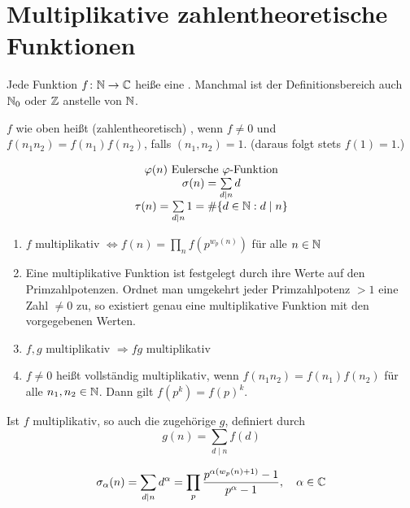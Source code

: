 \section{Multiplikative zahlentheoretische Funktionen}
\label{sec:para8}
	Jede Funktion $f \colon \mathbb{N} \rightarrow \mathbb{C}$ heiße eine . Manchmal ist der Definitionsbereich auch $\mathbb{N}_0$ oder $\mathbb{Z}$ anstelle von $\mathbb{N}$.

\begin{defn}	\label{def_8.1}
	$f$ wie oben heißt (zahlentheoretisch) , wenn $f \neq 0$ und $f(n_1n_2) = f(n_1)f(n_2)$, falls $(n_1,n_2) = 1$. (daraus folgt stets $f(1) = 1$.)
\end{defn}

	\[ \begin{array}{c}
	\varphi(n) \text{ Eulersche } \varphi\text{-Funktion} \\ 
	\sigma(n) = \sum\limits_{d \mid n} d \\ 
	\tau(n) = \sum\limits_{d \mid n} 1 = \#\{d \in \mathbb{N} : d \mid n\}
	\end{array} \]

	\begin{enumerate}[1)]
		\item $f$ multiplikativ $\Leftrightarrow f(n) = \prod\limits_{n} f(p^{w_p(n)})$ für alle $n \in \mathbb{N}$
		\item Eine multiplikative Funktion ist festgelegt durch ihre Werte auf den Primzahlpotenzen. Ordnet man umgekehrt jeder Primzahlpotenz $> 1$ eine Zahl $\neq 0$ zu, so existiert genau eine multiplikative Funktion mit den vorgegebenen Werten.
		\item $f, g$ multiplikativ $\Rightarrow fg$ multiplikativ
		\item $f \neq 0$ heißt vollständig multiplikativ, wenn $f(n_1n_2) = f(n_1)f(n_2)$ für alle $n_1, n_2 \in \mathbb{N}$. Dann gilt $f(p^k) = f(p)^k$.
	\end{enumerate}
	
\begin{falko} \label{F8.1}
	Ist $f$ multiplikativ, so auch die zugehörige  $g$, definiert durch 
	\[ g(n) = \sum\limits_{d \mid n} f(d) \]
\end{falko}

	\[ \sigma_\alpha(n) = \sum\limits_{d \mid n} d^\alpha = \prod\limits_{p} \frac{p^{\alpha(w_p(n)+1)}-1}{p^\alpha - 1}, \quad \alpha \in \CC \index{Teilersummenfunktion}\]

